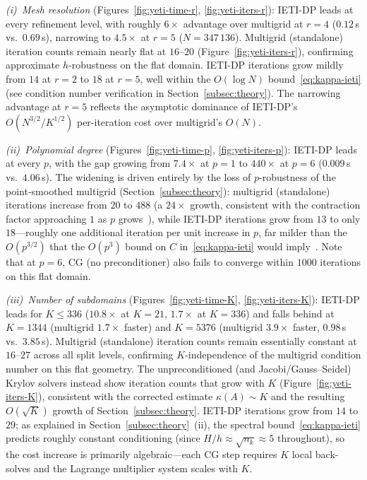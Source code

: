 \documentclass{article}
\theoremstyle{plain}
\numberwithin{equation}{section}
\begin{document}
\emph{(i)~Mesh resolution} (Figures~\ref{fig:yeti-time-r},
\ref{fig:yeti-iters-r}):
IETI-DP leads at every refinement level, with roughly $6\times$ advantage
over multigrid at $r=4$ ($0.12\,$s vs.\ $0.69\,$s),
narrowing to $4.5\times$ at $r=5$ ($N=347\,136$).
Multigrid (standalone) iteration counts remain nearly flat at $16$--$20$
(Figure~\ref{fig:yeti-iters-r}), confirming approximate $h$-robustness on
the flat domain.
IETI-DP iterations grow mildly from $14$ at $r=2$ to $18$ at $r=5$, well
within the $O(\log N)$ bound~\eqref{eq:kappa-ieti} (see condition number
verification in Section~\ref{subsec:theory}).
The narrowing advantage at $r=5$ reflects the asymptotic dominance of
IETI-DP's $O(N^{3/2}/K^{1/2})$ per-iteration cost over multigrid's $O(N)$.

\emph{(ii)~Polynomial degree} (Figures~\ref{fig:yeti-time-p},
\ref{fig:yeti-iters-p}):
IETI-DP leads at every $p$, with the gap growing from $7.4\times$ at $p=1$
to $440\times$ at $p=6$ ($0.009\,$s vs.\ $4.06\,$s).
The widening is driven entirely by the loss of $p$-robustness of the
point-smoothed multigrid (Section~\ref{subsec:theory}): multigrid (standalone)
iterations increase from $20$ to $488$ (a $24\times$ growth, consistent with the
contraction factor approaching $1$ as $p$
grows~\cite{donatelli2015robust,tielen2020pmultigrid}), while IETI-DP iterations
grow from $13$ to only $18$---roughly one additional iteration per unit increase
in $p$, far milder than the $O(p^{3/2})$ that the $O(p^{3})$ bound on $C$
in~\eqref{eq:kappa-ieti} would imply~\cite{kleiss2012ieti}.
Note that at $p=6$, CG (no preconditioner) also fails to converge within $1000$
iterations on this flat domain.

\emph{(iii)~Number of subdomains} (Figures~\ref{fig:yeti-time-K},
\ref{fig:yeti-iters-K}):
IETI-DP leads for $K\leq 336$ ($10.8\times$ at $K=21$, $1.7\times$ at $K=336$)
and falls behind at $K=1344$ (multigrid $1.7\times$ faster) and $K=5376$
(multigrid $3.9\times$ faster, $0.98\,$s vs.\ $3.85\,$s).
Multigrid (standalone) iteration counts remain essentially constant at $16$--$27$
across all split levels, confirming $K$-independence of the multigrid condition
number on this flat geometry.
The unpreconditioned (and Jacobi/Gauss--Seidel) Krylov solvers instead show
iteration counts that grow with $K$ (Figure~\ref{fig:yeti-iters-K}), consistent
with the corrected estimate $\kappa(A)\sim K$ and the resulting $O(\sqrt{K})$
growth of Section~\ref{subsec:theory}.
IETI-DP iterations grow from $14$ to $29$; as explained in
Section~\ref{subsec:theory}~(ii), the spectral bound~\eqref{eq:kappa-ieti}
predicts roughly constant conditioning (since $H/h\approx\sqrt{n_k}\approx 5$
throughout), so the cost increase is primarily algebraic---each CG step
requires $K$ local back-solves and the Lagrange multiplier system scales
with $K$.
\end{document}

